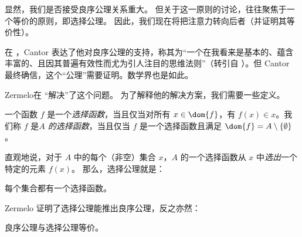 \documentclass[../../../include/open-logic-section]{subfiles}
\begin{document}

显然，我们是否接受良序公理关系重大。
但关于这一原则的讨论，往往聚焦于一个等价的原则，即选择公理。
因此，我们现在将把注意力转向后者（并证明其等价性）。

在 \citeyear{Cantor1883}，Cantor 表达了他对良序公理的支持，称其为“一个在我看来是基本的、蕴含丰富的、且因其普遍有效性而尤为引人注目的思维法则”（转引自 \citeauthor{Potter2004} \citeyear[p.~243]{Potter2004}）。但 Cantor 最终确信，这个“公理”需要证明。数学界也是如此。

Zermelo在 \citeyear{Zermelo1904} “解决”了这个问题。
为了解释他的解决方案，我们需要一些定义。

\begin{defn}
一个函数 $f$ 是一个\emph{选择函数}，当且仅当对所有 $x \in \dom{f}$，有 $f(x) \in x$。我们称 $f$ 是\emph{$A$ 的选择函数}，当且仅当 $f$ 是一个选择函数且满足 $\dom{f} = A \setminus \{\emptyset\}$。
\end{defn}

直观地说，对于 $A$ 中的每个（非空）集合 $x$，$A$ 的一个选择函数从 $x$ 中\emph{选出}一个特定的元素 $f(x)$。
那么，选择公理就是：

\begin{axiom}[选择]
	每个集合都有一个选择函数。
\end{axiom}

Zermelo 证明了选择公理能推出良序公理，反之亦然：

\begin{thm}[在 $\ZF$ 中]
良序公理与选择公理等价。
\end{thm}
\end{document}
